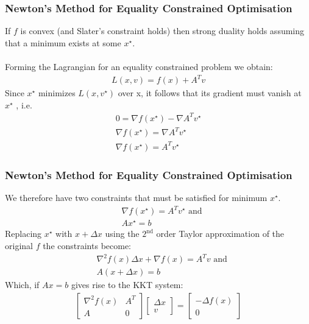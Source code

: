 \documentclass{beamer}
\begin{document}
\begin{frame}
    \frametitle{Newton's Method for Equality Constrained Optimisation}
    If $f$ is convex (and Slater's constraint holds) then strong duality holds
    assuming that a minimum exists at some $x^{\star}$.
    \\~\\
    Forming the Lagrangian for an equality constrained problem we
    obtain:
    \begin{align*}
        L(x, v) = f(x) + A^{T}v
    \end{align*}
    Since $x^{\star}$ minimizes $L(x, v^{\star} )$ over x, it follows that
    its gradient must vanish at $x^{\star}$ , i.e.
    \begin{align*}
        0 = \nabla f(x^{\star}) -  \nabla A^{T}v^{\star} \\
        \nabla f(x^{\star}) = \nabla A^{T}v^{\star} \\
        \nabla f(x^{\star}) = A^{T} v^{\star}
    \end{align*}
\end{frame}

\begin{frame}
    \frametitle{Newton's Method for Equality Constrained Optimisation}
    We therefore have two constraints that must be satisfied for minimum
    $x^{\star}$.
    \begin{align*}
        &\nabla f(x^{\star}) = A^{T} v^{\star} \text{ and} \\
        &A x^{\star} = b
    \end{align*}
    Replacing $x^{\star}$ with $x + \Delta x$ using the $2^{\text{nd}}$ order
    Taylor approximation of the original $f$ the constraints become:
    \begin{align*}
        &\nabla^{2}f(x)\Delta x + \nabla f(x) = A^{T}v \text{ and}\\
        &A(x + \Delta x) = b
    \end{align*}
    Which, if $Ax = b$ gives rise to the KKT system:
    \begin{align*}
        \begin{bmatrix}
            \nabla^{2}f(x) & A^{T} \\
            A & 0
        \end{bmatrix}
        \begin{bmatrix}
            \Delta x \\
            v
        \end{bmatrix}
        =
        \begin{bmatrix}
            -\Delta f(x) \\
            0
        \end{bmatrix}
    \end{align*}
\end{frame}
\end{document}
